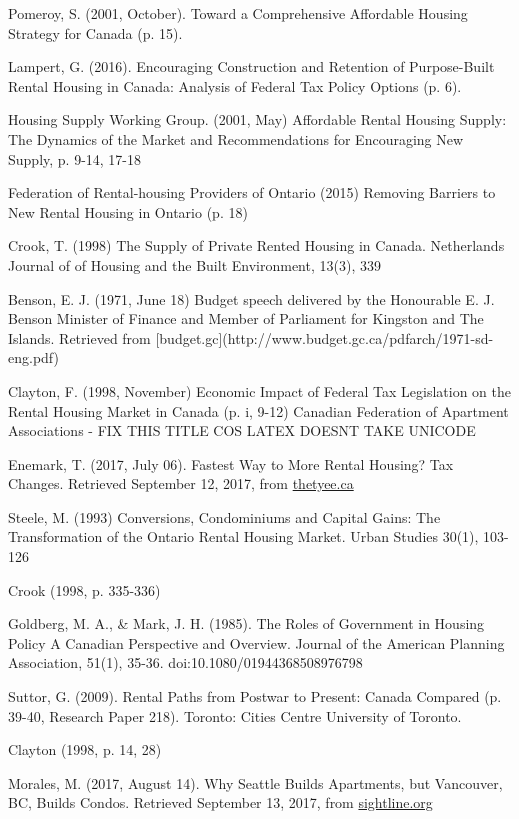 \begin{thebibliography}{9}
 Pomeroy, S. (2001, October). Toward a Comprehensive Affordable Housing Strategy for Canada (p. 15).

Lampert, G. (2016). Encouraging Construction and Retention of Purpose-Built Rental Housing in Canada: Analysis of Federal Tax Policy Options (p. 6). 

 Housing Supply Working Group. (2001, May) Affordable Rental Housing Supply: The Dynamics of the Market and Recommendations for Encouraging New Supply, p. 9-14, 17-18

 Federation of Rental-housing Providers of Ontario (2015) Removing Barriers to New Rental Housing in Ontario (p. 18)

 Crook, T. (1998) The Supply of Private Rented Housing in Canada. Netherlands Journal of of Housing and the Built Environment, 13(3), 339

 Benson, E. J. (1971, June 18) Budget speech delivered by the Honourable E. J. Benson Minister of Finance and Member of Parliament for Kingston and The Islands. Retrieved from [budget.gc](http://www.budget.gc.ca/pdfarch/1971-sd-eng.pdf)

 Clayton, F. (1998, November) Economic Impact of Federal Tax Legislation on the Rental Housing Market in Canada (p. i, 9-12) Canadian Federation of Apartment Associations - FIX THIS TITLE COS LATEX DOESNT TAKE UNICODE %

  Enemark, T. (2017, July 06). Fastest Way to More Rental Housing? Tax Changes. Retrieved September 12, 2017, from \href{https://thetyee.ca/Opinion/2017/07/06/Tax-Changes-More-Rental-Housing/}{thetyee.ca}

  Steele, M. (1993) Conversions, Condominiums and Capital Gains: The Transformation of the Ontario Rental Housing Market. Urban Studies 30(1), 103-126

 Crook (1998, p. 335-336)

 Goldberg, M. A., \& Mark, J. H. (1985). The Roles of Government in Housing Policy A Canadian Perspective and Overview. Journal of the American Planning Association, 51(1), 35-36. doi:10.1080/01944368508976798

 Suttor, G. (2009). Rental Paths from Postwar to Present: Canada Compared (p. 39-40, Research Paper 218). Toronto: Cities Centre University of Toronto.

 Clayton (1998, p. 14, 28) 

  Morales, M. (2017, August 14). Why Seattle Builds Apartments, but Vancouver, BC, Builds Condos. Retrieved September 13, 2017, from \href{http://www.sightline.org/2017/08/14/why-seattle-builds-apartments-but-vancouver-bc-builds-condos/}{sightline.org}

  

\end{thebibliography}

